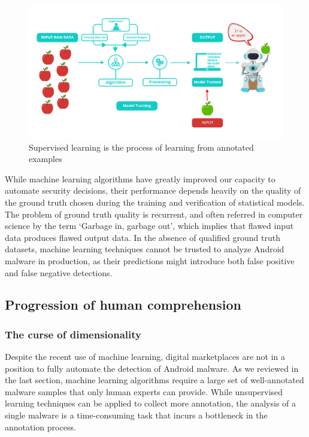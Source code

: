 \begin{figure}[!ht]
        \centering
	\includegraphics[width=\linewidth]{figures/introduction/supervised.png}
        \caption[Supervised learning is the process of learning from annotated examples]{Supervised learning is the process of learning from annotated examples~\cite{vaseekaran_machine_2018}}
	\label{figure:introduction:learning}
\end{figure}

While machine learning algorithms have greatly improved our capacity to automate security decisions, their performance depends heavily on the quality of the ground truth chosen during the training and verification of statistical models.
The problem of ground truth quality is recurrent, and often referred in computer science by the term `Garbage in, garbage out', which implies that flawed input data produces flawed output data.
In the absence of qualified ground truth datasets, machine learning techniques cannot be trusted to analyze Android malware in production, as their predictions might introduce both false positive and false negative detections.
\subsection{Progression of human comprehension}
\subsubsection{The curse of dimensionality}
Despite the recent use of machine learning, digital marketplaces are not in a position to fully automate the detection of Android malware.
As we reviewed in the last section, machine learning algorithms require a large set of well-annotated malware samples that only human experts can provide.
While unsupervised learning techniques can be applied to collect more annotation, the analysis of a single malware is a time-consuming task that incurs a bottleneck in the annotation process.


